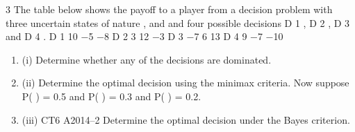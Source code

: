\documentclass[a4paper,12pt]{article}
\begin{document}
\begin{enumerate}



3
The table below shows the payoff to a player from a decision problem with three
uncertain states of nature  ,  and  and four possible decisions D 1 , D 2 , D 3 and D 4 .
D 1
10
−5
−8
D 2
3
12
−3
D 3
−7
6
13
D 4
9
−7
−10
\begin{enumerate}
\item (i) Determine whether any of the decisions are dominated. 
\item (ii) Determine the optimal decision using the minimax criteria. 
Now suppose P( ) = 0.5 and P( ) = 0.3 and P( ) = 0.2.
\item (iii)
CT6 A2014–2
Determine the optimal decision under the Bayes criterion.
\end{enumerate}





\end{enumerate}
\end{document}
